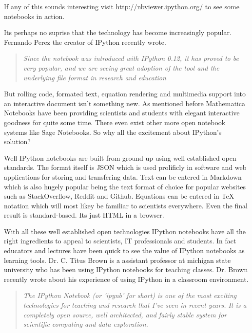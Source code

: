 \documentclass[11pt, a4paper]{article}  %
\begin{document}
\begin{multicols}{2}
If any of this sounds interesting visit \url{http://nbviewer.ipython.org/} to
see some notebooks in action. 

Its perhaps no suprise that the technology has become increasingly popular.
Fernando Perez the creator of IPython recently wrote. \cite{perez}

\begin{quote}
\textit{Since the notebook was introduced with IPython 0.12, it has proved to
be very popular, and we are seeing great adoption of the tool and the
underlying file format in research and education}
\end{quote}

But rolling code, formated text, equation rendering and multimedia support
into an interactive document isn't something new. As mentioned before
Mathematica Notebooks have been providing scientists and students with elegant
interactive goodness for quite some time. There even exist other more open
notebook systems like Sage Notebooks. So why all the excitement about
IPython's solution?

Well IPython notebooks are built from ground up using well established open
standards. The format itself is JSON which is used prolificly in software and
web applications for storing and transfering data. Text can be entered in
Markdown which is also hugely popular being the text format of choice for
popular websites such as StackOverflow, Reddit and Github. Equations can be
entered in TeX notation which will most likey be familiar to scientists
everywhere. Even the final result is standard-based. Its just HTML in a
browser.

With all these well established open technologies IPython notebooks have all
the right ingredients to appeal to scientists, IT professionals and students.
In fact educators and lectures have been quick to see the value of IPython
notebooks as learning tools. Dr. C. Titus Brown is a assistant professor at
michigan state university who has been using IPython notebooks for teaching
classes. Dr. Brown recently wrote about his experience of using IPython in a
classroom environment. \cite{brown}

\begin{quote} 
\textit{The IPython Notebook (or 'ipynb' for short) is one of the most
exciting technologies for teaching and research that I've seen in recent
years. It is a completely open source, well architected, and fairly stable
system for scientific computing and data exploration.}
\end{quote}


\end{multicols}
\end{document}
